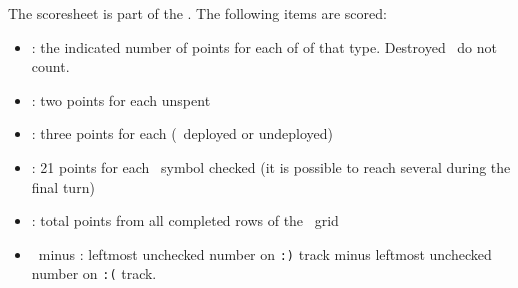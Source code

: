 The scoresheet is part of the \planetsheet.  The following items are scored:
\begin{itemize}
  \item \armaments: the indicated number of points for each of \armament of that type. Destroyed \armament\ do not count.
  \item \currency: two points for each unspent \currency
  \item \squadrons: three points for each (\squadron\ deployed or undeployed)
  \item \mastery: 21 points for each \masterysymbol\ symbol checked (it is possible to reach several during the final turn)
  \item \culture: total points from all completed rows of the \culture\ grid
  \item \happiness\ minus \unhappiness: leftmost unchecked number on \texttt{:)} track minus leftmost unchecked number on \texttt{:(} track.
\end{itemize}
